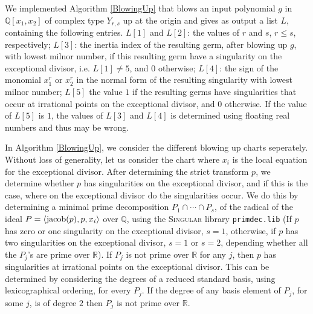 \documentclass[noend]{amsproc}
\begin{document}
We implemented Algorithm \ref{BlowingUp} that blows an input polynomial $g$ in
$\mathbb Q[x_1,x_2]$ of complex type $Y_{r,s}$ up at the origin and gives as
output a list $L$, containing the following entries. $L[1]$ and $L[2]$: the
values of $r$ and $s$, $r\le s$, respectively; $L[3]$: the inertia index of the
resulting germ, after blowing up $g$, with lowest milnor number, if this
resulting germ have a singularity on the exceptional divisor, i.e. $L[1]\neq
5$, and $0$ otherwise; $L[4]$: the sign of the monomial $x_1^r$ or $x_2^r$ in
the normal form of the resulting singularity with lowest milnor number; $L[5]$
the value $1$ if the resulting germs have singularities that occur at
irrational points on the exceptional divisor, and $0$ otherwise. If the value
of $L[5]$ is $1$, the values of $L[3]$ and $L[4]$ is determined using floating
real numbers and thus may be wrong.

In Algorithm \ref{BlowingUp}, we consider the different blowing up charts
seperately. Without loss of generality, let us consider the chart where $x_i$
is the local equation for the exceptional divisor. After determining the strict
transform $p$, we determine whether $p$ has singularities on the exceptional
divisor, and if this is the case, where on the exceptional divisor do the
singularities occur. We do this by determining a minimal prime decomposition
$P_1\cap\cdots\cap P_s$, of the radical of the ideal $P=\langle
\textnormal{jacob}(p),p,x_i\rangle$ over $\mathbb Q$, using the \textsc{Singular}
library {\tt primdec.lib} \cite{primdec.lib} (If $p$ has zero or one singularity
on the exceptional divisor, $s=1$, otherwise, if $p$ has two singularities on
the exceptional divisor, $s=1$ or $s=2$, depending whether all the $P_j$'s are
prime over $\mathbb R$).  If $P_j$ is not prime over $\mathbb R$ for any $j$,
then $p$ has singularities at irrational points on the exceptional divisor.
This can be determined by considering the degrees of a reduced standard basis,
using lexicographical ordering, for every $P_j$. If the degree of any basis
element of $P_j$, for some $j$, is of degree $2$ then $P_j$ is not prime over
$\mathbb R$.
\end{document}
